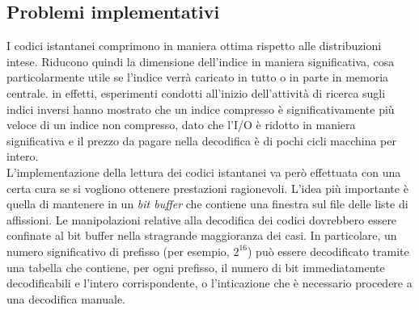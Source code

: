 \subsection{Problemi implementativi}
I codici istantanei comprimono in maniera ottima rispetto alle distribuzioni intese. Riducono quindi la dimensione dell'indice in maniera significativa, cosa particolarmente utile se l'indice verrà caricato in tutto o in parte in memoria centrale. in effetti, esperimenti condotti all'inizio dell'attività di ricerca sugli indici inversi hanno mostrato che un indice compresso è significativamente più veloce di un indice non compresso, dato che l'I/O è ridotto in maniera significativa e il prezzo da pagare nella decodifica è di pochi cicli macchina per intero.\\
L'implementazione della lettura dei codici istantanei va però effettuata con una certa cura se si vogliono ottenere prestazioni ragionevoli. L'idea più importante è quella di mantenere in un \textit{bit buffer} che contiene una finestra sul file delle liste di affissioni. Le manipolazioni relative alla decodifica dei codici dovrebbero essere confinate al bit buffer nella stragrande maggioranza dei casi. In particolare, un numero significativo di prefisso (per esempio, $2^{16}$) può essere decodificato tramite una tabella che contiene, per ogni prefisso, il numero di bit immediatamente decodificabili e l'intero corrispondente, o l'inticazione che è necessario procedere a una decodifica manuale.
